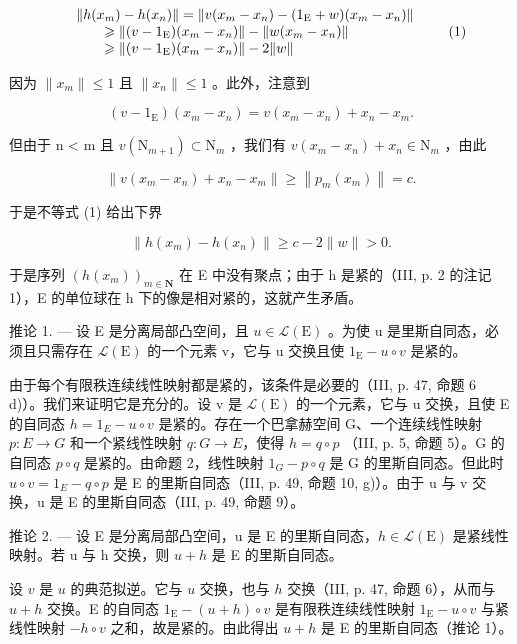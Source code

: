 \[
\begin{array}{r l} & {\| h (x _ {m}) - h (x _ {n}) \| = \| v (x _ {m} - x _ {n}) - (1 _ {\mathrm{E}} + w) (x _ {m} - x _ {n}) \|} \\ & {\qquad \geqslant \| (v - 1 _ {\mathrm{E}}) (x _ {m} - x _ {n}) \| - \| w (x _ {m} - x _ {n}) \|} \\ & {\qquad \geqslant \| (v - 1 _ {\mathrm{E}}) (x _ {m} - x _ {n}) \| - 2 \| w \|} \end{array}\tag{1}
\]

因为 \(\| x_m\| \leqslant 1\) 且 \(\| x_n\| \leqslant 1\) 。此外，注意到

\[
(v - 1 _ {\mathrm{E}}) (x _ {m} - x _ {n}) = v (x _ {m} - x _ {n}) + x _ {n} - x _ {m}.
\]

但由于 n \textless{} m 且 \(v(\mathrm{N}_{m+1}) \subset \mathrm{N}_{m}\) ，我们有 \(v(x_{m} - x_{n}) + x_{n} \in \mathrm{N}_{m}\) ，由此

\[
\left\| v (x _ {m} - x _ {n}) + x _ {n} - x _ {m} \right\| \geqslant \left\| p _ {m} (x _ {m}) \right\| = c.
\]

于是不等式 (1) 给出下界

\[
\left\| h \left(x _ {m}\right) - h \left(x _ {n}\right) \right\| \geqslant c - 2 \| w \| > 0.\tag{2}
\]

于是序列 \((h(x_{m}))_{m\in\mathbf{N}}\) 在 E 中没有聚点；由于 h 是紧的（III, p. 2 的注记 1），E 的单位球在 h 下的像是相对紧的，这就产生矛盾。

推论 1. --- 设 E 是分离局部凸空间，且 \(u \in \mathcal{L}(\mathrm{E})\) 。为使 u 是里斯自同态，必须且只需存在 \(\mathcal{L}(\mathrm{E})\) 的一个元素 v，它与 u 交换且使 \(1_{\mathrm{E}} - u \circ v\) 是紧的。

由于每个有限秩连续线性映射都是紧的，该条件是必要的（III, p. 47, 命题 6 d)）。我们来证明它是充分的。设 v 是 \(\mathcal{L}(\mathrm{E})\) 的一个元素，它与 u 交换，且使 E 的自同态 \(h = 1_{E} - u \circ v\) 是紧的。存在一个巴拿赫空间 G、一个连续线性映射 \(p: E \to G\) 和一个紧线性映射 \(q: G \to E\)，使得 \(h = q \circ p\) （III, p. 5, 命题 5）。G 的自同态 \(p \circ q\) 是紧的。由命题 2，线性映射 \(1_{G} - p \circ q\) 是 G 的里斯自同态。但此时 \(u \circ v = 1_{E} - q \circ p\) 是 E 的里斯自同态（III, p. 49, 命题 10, g)）。由于 u 与 v 交换，u 是 E 的里斯自同态（III, p. 49, 命题 9）。

推论 2. --- 设 E 是分离局部凸空间，u 是 E 的里斯自同态，\(h \in \mathcal{L}(\mathrm{E})\) 是紧线性映射。若 u 与 h 交换，则 \(u + h\) 是 E 的里斯自同态。

设 \(v\) 是 \(u\) 的典范拟逆。它与 \(u\) 交换，也与 \(h\) 交换（III, p. 47, 命题 6），从而与 \(u + h\) 交换。E 的自同态 \(1_{\mathrm{E}} - (u + h) \circ v\) 是有限秩连续线性映射 \(1_{\mathrm{E}} - u \circ v\) 与紧线性映射 \(-h \circ v\) 之和，故是紧的。由此得出 \(u + h\) 是 E 的里斯自同态（推论 1）。

